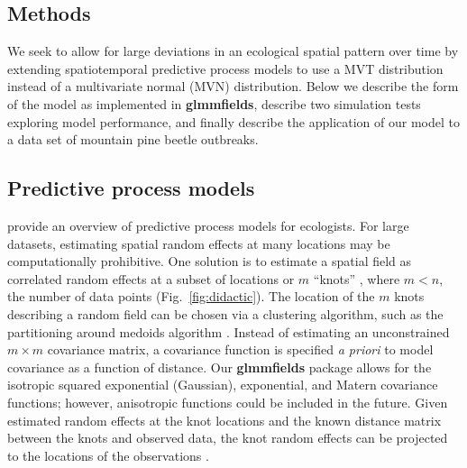 \documentclass[12pt,english]{article}
\newcommand{\R}[1]{\label{#1}\linelabel{#1}}
\begin{document}
\begin{spacing}{1.8}
\section{Methods}

We seek to allow for large deviations in an ecological spatial pattern over time
by extending spatiotemporal predictive process models to use a MVT distribution
instead of a multivariate normal (MVN) distribution. Below we describe the form
of the model as implemented in \textbf{glmmfields}, describe two simulation
tests exploring model performance, and finally describe the application of our
model to a data set of mountain pine beetle outbreaks.

\subsection{Predictive process models}

\citet{latimer2009} provide an overview of predictive process models for
ecologists. For large datasets, estimating spatial random effects at many
locations may be computationally prohibitive. One solution is to estimate a
spatial field as correlated random effects at a subset of locations or $m$
``knots'' \citep[e.g.][]{latimer2009, shelton2014}, where $m < n$, the number of
data points (Fig.~\ref{fig:didactic}).\R{B11} The location of the $m$ knots describing a random field can be
chosen via a clustering algorithm, such as the partitioning around medoids
algorithm \citep{reynolds2006}. Instead of estimating an unconstrained $m \times
m$ covariance matrix, a covariance function is specified \emph{a priori} to
model covariance as a function of distance. Our \textbf{glmmfields} package
allows for the isotropic squared exponential (Gaussian), exponential, and Matern
covariance functions; however, anisotropic functions could be included in the
future. Given estimated random effects at the knot locations and the known
distance matrix between the knots and observed data, the knot random effects can
be projected to the locations of the observations
\citep[][Fig.~\ref{fig:didactic}]{roislien2007, latimer2009, finley2009}.


\end{spacing}
\end{document}
